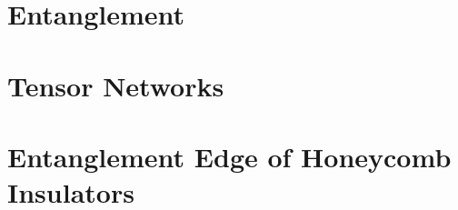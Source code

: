 \documentclass[t]{beamer}
\begin{document}
\section{Entanglement}






\section{Tensor Networks}







\section{Entanglement Edge of Honeycomb Insulators}










%


\section*{}









\end{document}

